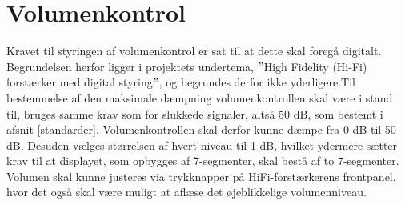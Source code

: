 \section{Volumenkontrol}
\label{valg_volumenkontrol}
Kravet til styringen af volumenkontrol er sat til at dette skal foregå digitalt. Begrundelsen herfor ligger i projektets undertema, $"$High Fidelity (Hi-Fi) forstærker med digital styring$"$, og begrundes derfor ikke yderligere.Til bestemmelse af den maksimale dæmpning volumenkontrollen skal være i stand til, bruges samme krav som for slukkede signaler, altså 50 dB, som bestemt i afsnit \ref{standarder}. Volumenkontrollen skal derfor kunne dæmpe fra  0 dB til 50 dB. Desuden vælges størrelsen af hvert niveau til 1 dB, hvilket ydermere sætter krav til at displayet, som opbygges af 7-segmenter, skal bestå af to 7-segmenter.\\
Volumen skal kunne justeres via trykknapper på HiFi-forstærkerens frontpanel, hvor det også skal være muligt at aflæse det øjeblikkelige volumenniveau.  
